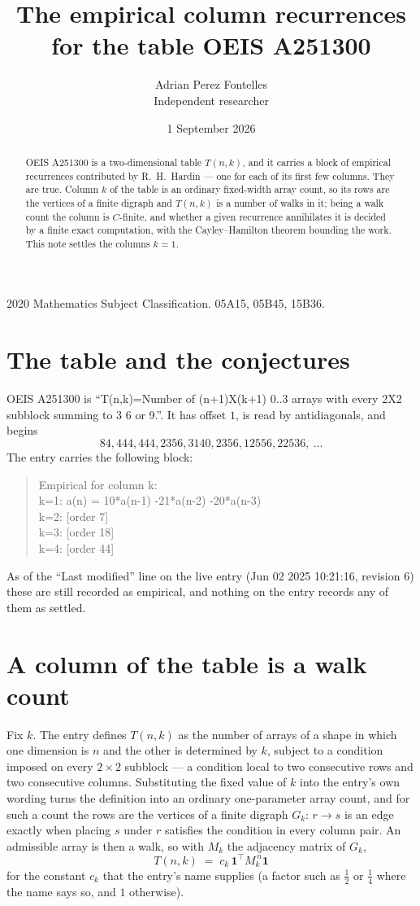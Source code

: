 \documentclass[11pt,a4paper]{article}
\title{The empirical column recurrences for the table OEIS A251300}
\author{Adrian Perez Fontelles\\ \small Independent researcher}
\date{1 September 2026}
\theoremstyle{plain}
\theoremstyle{definition}
\begin{document}
\maketitle

\begin{abstract}
OEIS A251300 is a two-dimensional table $T(n,k)$, and it carries a block of empirical
recurrences contributed by R.~H.~Hardin --- one for each of its first few columns. They are
true. Column $k$ of the table is an ordinary fixed-width array count, so its rows are the
vertices of a finite digraph and $T(n,k)$ is a number of walks in it; being a walk count the
column is $C$-finite, and whether a given recurrence annihilates it is decided by a finite
exact computation, with the Cayley--Hamilton theorem bounding the work. This note settles the columns $k=1$.
\end{abstract}

\noindent\small 2020 Mathematics Subject Classification. 05A15, 05B45, 15B36.\normalsize

\section{The table and the conjectures}

OEIS A251300 is ``T(n,k)=Number of (n+1)X(k+1) 0..3 arrays with every 2X2 subblock summing to 3 6 or 9.''. It has offset $1$, is
read by antidiagonals, and begins
\[
84, 444, 444, 2356, 3140, 2356, 12556, 22536,\ \dots
\]
The entry carries the following block:
\begin{quote}\small
Empirical for column k:\\
k=1: a(n) = 10*a(n-1) -21*a(n-2) -20*a(n-3)\\
k=2: [order 7]\\
k=3: [order 18]\\
k=4: [order 44]\\
\end{quote}
As of the ``Last modified'' line on the live entry (Jun 02 2025 10:21:16, revision 6) these are still
recorded as empirical, and nothing on the entry records any of them as settled.

\section{A column of the table is a walk count}

Fix $k$. The entry defines $T(n,k)$ as the number of arrays of a shape in which one dimension
is $n$ and the other is determined by $k$, subject to a condition imposed on every
$2\times2$ subblock --- a condition local to two consecutive rows and two consecutive columns.
Substituting the fixed value of $k$ into the entry's own wording turns the definition into an
ordinary one-parameter array count, and for such a count the rows are the vertices of a finite
digraph $G_k$: $r\to s$ is an edge exactly when placing $s$ under $r$ satisfies the condition
in every column pair. An admissible array is then a walk, so with $M_k$ the adjacency matrix
of $G_k$,
\[
T(n,k)\;=\;c_k\,\mathbf{1}^{\!\top}M_k^{\,n}\mathbf{1}
\]
for the constant $c_k$ that the entry's name supplies (a factor such as $\tfrac12$ or
$\tfrac14$ where the name says so, and $1$ otherwise).
\end{document}
